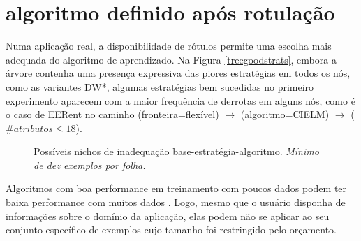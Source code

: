 \section{algoritmo definido após rotulação}\label{ind}
Numa aplicação real, a disponibilidade de rótulos permite uma escolha mais adequada
do algoritmo de aprendizado.
Na Figura \ref{treegoodstrats}, embora a árvore contenha uma presença expressiva das
piores estratégias em todos os nós, como as variantes DW*,
algumas estratégias bem sucedidas no primeiro experimento aparecem com a maior frequência
de derrotas em alguns nós, como é o caso de EERent no caminho
(fronteira=flexível) $\rightarrow$ (algoritmo=CIELM) $\rightarrow$ ($\#atributos \leq 18$).
\begin{figure}
\begin{center}
\caption{Possíveis nichos de inadequação base-estratégia-algoritmo.
\textit{Mínimo de dez exemplos por folha.}}
\begin{tikzpicture} [edge from parent/.style={->,above,draw,sloped,midway,gray!30,ultra thick},
text width=2.7cm, align=flush center, grow cyclic,
level 1/.style={level distance=3.2cm,sibling angle=180},
level 2/.style={text width=2cm, font=\footnotesize, level distance=3.2cm,sibling angle=60},
level 3/.style={text width=2cm, font=\footnotesize, level distance=3.2cm,sibling angle=60},
level 4/.style={text width=2cm, font=\footnotesize, level distance=3.2cm,sibling angle=60},
level 5/.style={text width=2cm, font=\footnotesize, level distance=3.2cm,sibling angle=60},
]

\label{treegoodstrats}
\end{tikzpicture}
\end{center}
\end{figure}

Algoritmos com boa performance em treinamento com poucos dados podem ter baixa
performance com muitos dados \citep{journals/sigkdd/AttenbergP10,journals/jmlr/PerlichPS03}.
Logo, mesmo que o usuário disponha de informações sobre o domínio da aplicação,
elas podem não se aplicar ao seu conjunto específico de exemplos cujo tamanho foi restringido pelo
orçamento.


